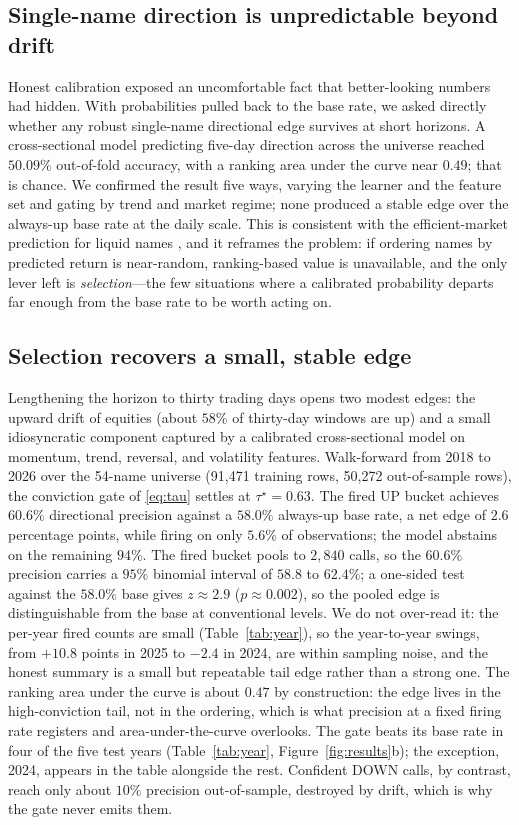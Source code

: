 \documentclass{elektr}
\begin{document}
\subsection{Single-name direction is unpredictable beyond drift}
\label{sec:ceiling}
Honest calibration exposed an uncomfortable fact that better-looking numbers had hidden. With probabilities pulled back to the base rate, we asked directly whether any robust single-name directional edge survives at short horizons. A cross-sectional model predicting five-day direction across the universe reached $50.09\%$ out-of-fold accuracy, with a ranking area under the curve near $0.49$; that is chance. We confirmed the result five ways, varying the learner and the feature set and gating by trend and market regime; none produced a stable edge over the always-up base rate at the daily scale. This is consistent with the efficient-market prediction for liquid names \cite{fama1970}, and it reframes the problem: if ordering names by predicted return is near-random, ranking-based value is unavailable, and the only lever left is \emph{selection}---the few situations where a calibrated probability departs far enough from the base rate to be worth acting on.

\subsection{Selection recovers a small, stable edge}
\label{sec:swing}
Lengthening the horizon to thirty trading days opens two modest edges: the upward drift of equities (about $58\%$ of thirty-day windows are up) and a small idiosyncratic component captured by a calibrated cross-sectional model on momentum, trend, reversal, and volatility features. Walk-forward from 2018 to 2026 over the 54-name universe (91{,}471 training rows, 50{,}272 out-of-sample rows), the conviction gate of \eqref{eq:tau} settles at $\tau^\star=0.63$. The fired UP bucket achieves $60.6\%$ directional precision against a $58.0\%$ always-up base rate, a net edge of $2.6$ percentage points, while firing on only $5.6\%$ of observations; the model abstains on the remaining $94\%$. The fired bucket pools to $2{,}840$ calls, so the $60.6\%$ precision carries a $95\%$ binomial interval of $58.8$ to $62.4\%$; a one-sided test against the $58.0\%$ base gives $z\approx2.9$ ($p\approx0.002$), so the pooled edge is distinguishable from the base at conventional levels. We do not over-read it: the per-year fired counts are small (Table~\ref{tab:year}), so the year-to-year swings, from $+10.8$ points in 2025 to $-2.4$ in 2024, are within sampling noise, and the honest summary is a small but repeatable tail edge rather than a strong one. The ranking area under the curve is about $0.47$ by construction: the edge lives in the high-conviction tail, not in the ordering, which is what precision at a fixed firing rate registers and area-under-the-curve overlooks. The gate beats its base rate in four of the five test years (Table~\ref{tab:year}, Figure~\ref{fig:results}b); the exception, 2024, appears in the table alongside the rest. Confident DOWN calls, by contrast, reach only about $10\%$ precision out-of-sample, destroyed by drift, which is why the gate never emits them.
\end{document}
